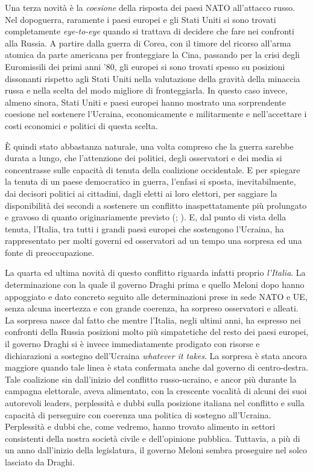 \documentclass[
]{book}
\begin{document}
Una terza novità è la \emph{coesione} della risposta dei paesi NATO all'attacco russo. Nel dopoguerra, raramente i paesi europei e gli Stati Uniti si sono trovati completamente \emph{eye-to-eye} quando si trattava di decidere che fare nei confronti alla Russia. A partire dalla guerra di Corea, con il timore del ricorso all'arma atomica da parte americana per fronteggiare la Cina, passando per la crisi degli Euromissili dei primi anni '80, gli europei si sono trovati spesso su posizioni dissonanti rispetto agli Stati Uniti nella valutazione della gravità della minaccia russa e nella scelta del modo migliore di fronteggiarla. In questo caso invece, almeno sinora, Stati Uniti e paesi europei hanno mostrato una sorprendente coesione nel sostenere l'Ucraina, economicamente e militarmente e nell'accettare i costi economici e politici di questa scelta.

È quindi stato abbastanza naturale, una volta compreso che la guerra sarebbe durata a lungo, che l'attenzione dei politici, degli osservatori e dei media si concentrasse sulle capacità di tenuta della coalizione occidentale. E per spiegare la tenuta di un paese democratico in guerra, l'enfasi si sposta, inevitabilmente, dai decisori politici ai cittadini, dagli eletti ai loro elettori, per saggiare la disponibilità dei secondi a sostenere un conflitto inaspettatamente più prolungato e gravoso di quanto originariamente previsto (\citet{Mueller1971}; \citet{Aldrich-et-al2006}). E, dal punto di vista della tenuta, l'Italia, tra tutti i grandi paesi europei che sostengono l'Ucraina, ha rappresentato per molti governi ed osservatori ad un tempo una sorpresa ed una fonte di preoccupazione.

La quarta ed ultima novità di questo conflitto riguarda infatti proprio \emph{l'Italia}. La determinazione con la quale il governo Draghi prima e quello Meloni dopo hanno appoggiato e dato concreto seguito alle determinazioni prese in sede NATO e UE, senza alcuna incertezza e con grande coerenza, ha sorpreso osservatori e alleati. La sorpresa nasce dal fatto che mentre l'Italia, negli ultimi anni, ha espresso nei confronti della Russia posizioni molto più simpatetiche del resto dei paesi europei, il governo Draghi si è invece immediatamente prodigato con risorse e dichiarazioni a sostegno dell'Ucraina \emph{whatever it takes}. La sorpresa è stata ancora maggiore quando tale linea è stata confermata anche dal governo di centro-destra. Tale coalizione sin dall'inizio del conflitto russo-ucraino, e ancor più durante la campagna elettorale, aveva alimentato, con la crescente vocalità di alcuni dei suoi autorevoli leaders, perplessità e dubbi sulla posizione italiana nel conflitto e sulla capacità di perseguire con coerenza una politica di sostegno all'Ucraina. Perplessità e dubbi che, come vedremo, hanno trovato alimento in settori consistenti della nostra società civile e dell'opinione pubblica. Tuttavia, a più di un anno dall'inizio della legislatura, il governo Meloni sembra proseguire nel solco lasciato da Draghi.
\end{document}
